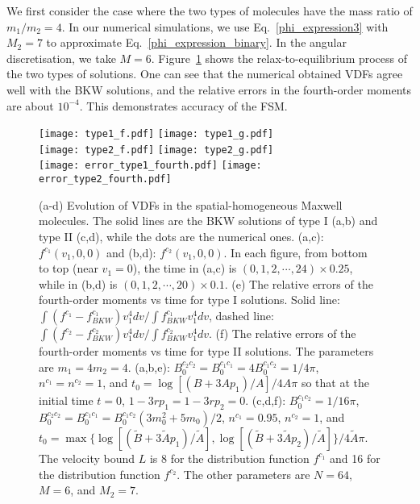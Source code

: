 We first consider the case where the two types of molecules have the mass ratio of $m_1/m_2=4$. In our numerical simulations, we use Eq.~\eqref{phi_expression3} with $M_2=7$ to approximate Eq.~\eqref{phi_expression_binary}. In the angular discretisation, we take $M=6$. Figure~\ref{mixture1} shows the relax-to-equilibrium process of the two types of solutions. One can see that the numerical obtained VDFs agree well with the BKW solutions, and the relative errors in the fourth-order moments are about $10^{-4}$. This demonstrates accuracy of the FSM. 

\begin{figure}[tbp]
  \centering
  \texttt{[image: type1\_f.pdf]}  \hskip 0.2cm
  \texttt{[image: type1\_g.pdf]}\\
  \vskip 0.2cm
  \texttt{[image: type2\_f.pdf]}  \hskip 0.2cm
  \texttt{[image: type2\_g.pdf]}\\
  \vskip 0.2cm
  \texttt{[image: error\_type1\_fourth.pdf]}
  \texttt{[image: error\_type2\_fourth.pdf]}
  \caption[Evolution of VDFs in the spatial-homogeneous Maxwell molecules when  $m_1=4m_2=4$.]{(a-d) Evolution of VDFs in the spatial-homogeneous Maxwell molecules. The solid lines are the BKW solutions of type I (a,b) and type II (c,d), while the dots are the numerical ones. (a,c): $f^{c_1}(v_1,0,0)$ and (b,d): $f^{c_2}(v_1,0,0)$. In each figure, from bottom to top (near $v_1=0$), the time in (a,c) is $(0,1,2,\cdots,24)\times0.25$, while in (b,d) is $(0,1,2,\cdots,20)\times0.1$. (e) The relative errors of the fourth-order moments vs time for type I solutions. Solid line: $\int{}(f^{c_1}-f_{BKW}^{c_1})v_1^4dv/\int{}f_{BKW}^{c_1}v_1^4dv$, dashed line: $\int{}(f^{c_2}-f_{BKW}^{c_2})v_1^4dv/\int{}f_{BKW}^{c_2}v_1^4dv$. (f) The relative errors of the fourth-order moments vs time for type II solutions. The parameters are $m_1=4m_2=4$. (a,b,e): $B_0^{c_2c_2}=B_0^{c_1c_1}=4B_0^{c_1c_2}=1/4\pi$, $n^{c_1}=n^{c_2}=1$, and $t_0=\log[(B+3Ap_1)/A]/4A\pi$ so that at the initial time $t=0$,   $1-3rp_1=1-3rp_2=0$. (c,d,f): $B_0^{c_1c_2}=1/16\pi$, $B_0^{c_2c_2}=B_0^{c_1c_1}=B_0^{c_1c_2}(3m_0^2+5m_0)/2$, $n^{c_1}=0.95$, $n^{c_2}=1$, and $t_0=\max\{\log[(\widetilde{B}+3\widetilde{A}p_1)/\widetilde{A}],\log[(\widetilde{B}+3\widetilde{A}p_2)/\widetilde{A}]\}/4\widetilde{A}\pi$.  The velocity bound $L$ is 8 for the distribution function $f^{c_1}$ and 16 for the distribution function $f^{c_2}$. The other parameters are $N=64$, $M=6$, and $M_2=7$. }
    \label{mixture1}  
\end{figure}


